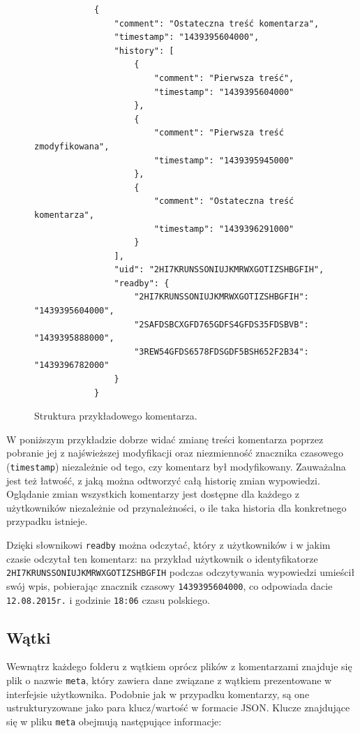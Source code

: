 \begin{figure}[t]
  \label{rys:comment}
  \begin{verbatim}
            {
                "comment": "Ostateczna treść komentarza", 
                "timestamp": "1439395604000", 
                "history": [
                    {
                        "comment": "Pierwsza treść", 
                        "timestamp": "1439395604000"
                    },
                    {
                        "comment": "Pierwsza treść zmodyfikowana", 
                        "timestamp": "1439395945000"
                    },
                    {
                        "comment": "Ostateczna treść komentarza", 
                        "timestamp": "1439396291000"
                    }
                ], 
                "uid": "2HI7KRUNSSONIUJKMRWXGOTIZSHBGFIH", 
                "readby": {
                    "2HI7KRUNSSONIUJKMRWXGOTIZSHBGFIH": "1439395604000",
                    "2SAFDSBCXGFD765GDFS4GFDS35FDSBVB": "1439395888000",
                    "3REW54GFDS6578FDSGDF5BSH652F2B34": "1439396782000"
                }
            }
  \end{verbatim}
  \caption{Struktura przykładowego komentarza.}
\end{figure}

W poniższym przykładzie dobrze widać zmianę treści komentarza poprzez pobranie jej z najświeższej modyfikacji oraz niezmienność znacznika czasowego (\texttt{timestamp}) niezależnie od tego, czy komentarz był modyfikowany. Zauważalna jest też łatwość, z jaką można odtworzyć całą historię zmian wypowiedzi. Oglądanie zmian wszystkich komentarzy jest dostępne dla każdego z użytkowników niezależnie od przynależności, o ile taka historia dla konkretnego przypadku istnieje.

Dzięki słownikowi \texttt{readby} można odczytać, który z użytkowników i w jakim czasie odczytał ten komentarz: na przykład użytkownik o identyfikatorze \texttt{2HI7KRUN\-SSONIUJ\-KMRWXGOTI\-ZSHBGFIH} podczas odczytywania wypowiedzi umieścił swój wpis, pobierając znacznik czasowy \texttt{1439395604000}, co odpowiada dacie \texttt{12.08.2015r.} i godzinie \texttt{18:06} czasu polskiego.

\subsection{Wątki}

Wewnątrz każdego folderu z wątkiem oprócz plików z komentarzami znajduje się plik o nazwie \texttt{meta}, który zawiera dane związane z wątkiem prezentowane w interfejsie użytkownika. Podobnie jak w przypadku komentarzy, są one ustrukturyzowane jako para klucz/wartość w formacie JSON. Klucze znajdujące się w pliku \texttt{meta} obejmują następujące informacje:

